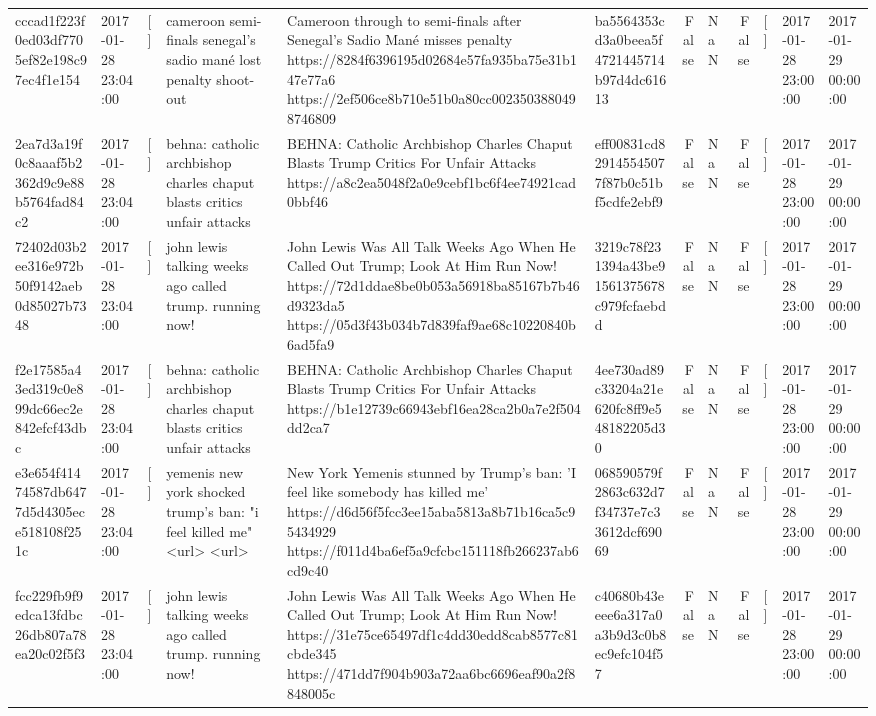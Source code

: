 \begin{tabular}{llllllrlrlll}
cccad1f223f0ed03df7705ef82e198c97ec4f1e154 & 2017-01-28 23:04:00 & [] & cameroon semi-finals senegal's sadio mané lost penalty shoot-out & Cameroon through to semi-finals after Senegal’s Sadio Mané misses penalty https://8284f6396195d02684e57fa935ba75e31b147e77a6 https://2ef506ce8b710e51b0a80cc0023503880498746809 & ba5564353cd3a0beea5f4721445714b97d4dc61613 & False & NaN & False & [] & 2017-01-28 23:00:00 & 2017-01-29 00:00:00 \\
2ea7d3a19f0c8aaaf5b2362d9c9e88b5764fad84c2 & 2017-01-28 23:04:00 & [] & behna: catholic archbishop charles chaput blasts critics unfair attacks & BEHNA: Catholic Archbishop Charles Chaput Blasts Trump Critics For Unfair Attacks https://a8c2ea5048f2a0e9cebf1bc6f4ee74921cad0bbf46 & eff00831cd829145545077f87b0c51bf5cdfe2ebf9 & False & NaN & False & [] & 2017-01-28 23:00:00 & 2017-01-29 00:00:00 \\
72402d03b2ee316e972b50f9142aeb0d85027b7348 & 2017-01-28 23:04:00 & [] & john lewis talking weeks ago called trump. running now! & John Lewis Was All Talk Weeks Ago When He Called Out Trump; Look At Him Run Now! https://72d1ddae8be0b053a56918ba85167b7b46d9323da5 https://05d3f43b034b7d839faf9ae68c10220840b6ad5fa9 & 3219c78f231394a43be91561375678c979fcfaebdd & False & NaN & False & [] & 2017-01-28 23:00:00 & 2017-01-29 00:00:00 \\
f2e17585a43ed319c0e899dc66ec2e842efcf43dbc & 2017-01-28 23:04:00 & [] & behna: catholic archbishop charles chaput blasts critics unfair attacks & BEHNA: Catholic Archbishop Charles Chaput Blasts Trump Critics For Unfair Attacks https://b1e12739c66943ebf16ea28ca2b0a7e2f504dd2ca7 & 4ee730ad89c33204a21e620fc8ff9e548182205d30 & False & NaN & False & [] & 2017-01-28 23:00:00 & 2017-01-29 00:00:00 \\
e3e654f41474587db6477d5d4305ece518108f251c & 2017-01-28 23:04:00 & [] & yemenis new york shocked trump's ban: "i feel killed me" <url> <url> & New York Yemenis stunned by Trump's ban: 'I feel like somebody has killed me' https://d6d56f5fcc3ee15aba5813a8b71b16ca5c95434929 https://f011d4ba6ef5a9cfcbc151118fb266237ab6cd9c40 & 068590579f2863c632d7f34737e7c33612dcf69069 & False & NaN & False & [] & 2017-01-28 23:00:00 & 2017-01-29 00:00:00 \\
fcc229fb9f9edca13fdbc26db807a78ea20c02f5f3 & 2017-01-28 23:04:00 & [] & john lewis talking weeks ago called trump. running now! & John Lewis Was All Talk Weeks Ago When He Called Out Trump; Look At Him Run Now! https://31e75ce65497df1c4dd30edd8cab8577c81cbde345 https://471dd7f904b903a72aa6bc6696eaf90a2f8848005c & c40680b43eeee6a317a0a3b9d3c0b8ec9efc104f57 & False & NaN & False & [] & 2017-01-28 23:00:00 & 2017-01-29 00:00:00 \\

\end{tabular}
